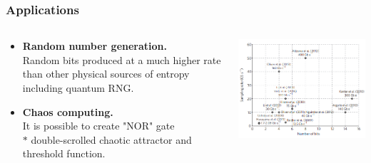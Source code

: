 


\begin{frame}
\frametitle{Applications}
\begin{columns}
\begin{column}{0.5\linewidth}       
\begin{itemize}
\item \textbf{Random number generation.}    \\
Random bits produced at a much higher rate than other physical sources of entropy including quantum RNG.    
\item \textbf{Chaos computing.} \\
It is possible to create "NOR" gate\\
$\ast$ double-scrolled chaotic attractor and threshold function. 
\end{itemize}
\end{column}
\begin{column}{0.5\linewidth}
    \includegraphics[width=\linewidth]{images/ChaosRNG.png}
\end{column}
\end{columns}
\end{frame}